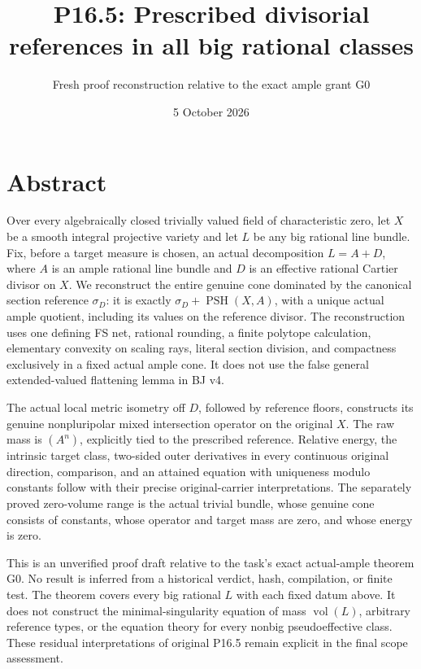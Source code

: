 \documentclass[
  10pt,
]{article}
\title{P16.5: Prescribed divisorial references in all big rational
classes}
\author{Fresh proof reconstruction relative to the exact ample grant G0}
\date{5 October 2026}
\begin{document}
\maketitle

\section{Abstract}\label{abstract}

Over every algebraically closed trivially valued field of characteristic
zero, let \(X\) be a smooth integral projective variety and let \(L\) be
any big rational line bundle. Fix, before a target measure is chosen, an
actual decomposition \(L=A+D\), where \(A\) is an ample rational line
bundle and \(D\) is an effective rational Cartier divisor on \(X\). We
reconstruct the entire genuine cone dominated by the canonical section
reference \(\sigma_D\): it is exactly
\(\sigma_D+\operatorname{PSH}(X,A)\), with a unique actual ample
quotient, including its values on the reference divisor. The
reconstruction uses one defining FS net, rational rounding, a finite
polytope calculation, elementary convexity on scaling rays, literal
section division, and compactness exclusively in a fixed actual ample
cone. It does not use the false general extended-valued flattening lemma
in BJ v4.

The actual local metric isometry off \(D\), followed by reference
floors, constructs its genuine nonpluripolar mixed intersection operator
on the original \(X\). The raw mass is \((A^n)\), explicitly tied to the
prescribed reference. Relative energy, the intrinsic target class,
two-sided outer derivatives in every continuous original direction,
comparison, and an attained equation with uniqueness modulo constants
follow with their precise original-carrier interpretations. The
separately proved zero-volume range is the actual trivial bundle, whose
genuine cone consists of constants, whose operator and target mass are
zero, and whose energy is zero.

This is an unverified proof draft relative to the task's exact
actual-ample theorem G0. No result is inferred from a historical
verdict, hash, compilation, or finite test. The theorem covers every big
rational \(L\) with each fixed datum above. It does not construct the
minimal-singularity equation of mass \(\operatorname{vol}(L)\),
arbitrary reference types, or the equation theory for every nonbig
pseudoeffective class. These residual interpretations of original P16.5
remain explicit in the final scope assessment.
\end{document}

